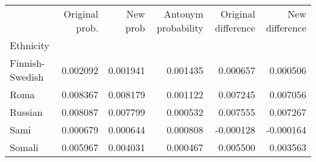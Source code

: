 \begin{tabular}{lrrrrr}
\toprule
{} &  Original prob. &  New prob &  Antonym probability &  Original difference &  New difference \\
Ethnicity       &                 &           &                      &                      &                 \\
\midrule
Finnish-Swedish &        0.002092 &  0.001941 &             0.001435 &             0.000657 &        0.000506 \\
Roma            &        0.008367 &  0.008179 &             0.001122 &             0.007245 &        0.007056 \\
Russian         &        0.008087 &  0.007799 &             0.000532 &             0.007555 &        0.007267 \\
Sami            &        0.000679 &  0.000644 &             0.000808 &            -0.000128 &       -0.000164 \\
Somali          &        0.005967 &  0.004031 &             0.000467 &             0.005500 &        0.003563 \\
\bottomrule
\end{tabular}
